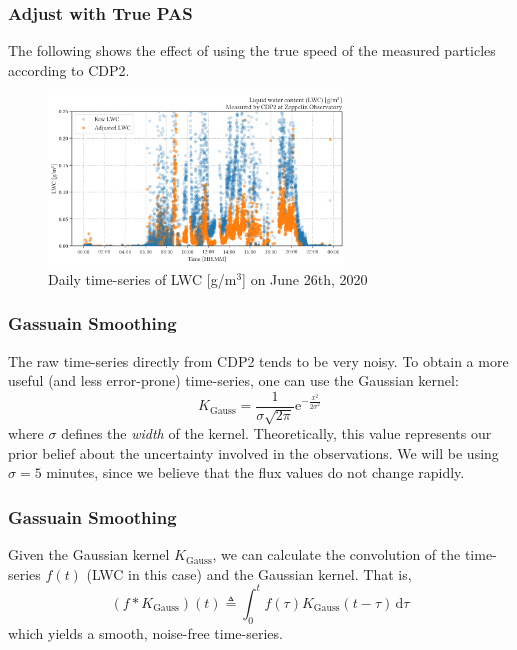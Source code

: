 \documentclass{beamer}
\begin{document}
\begin{frame}
    \frametitle{Adjust with True PAS}
    The following shows the effect of using the true speed of the measured particles according to CDP2.

    \begin{figure}
        \centering
        \includegraphics[width=0.7\textwidth]{img/pas.png}
        \caption{Daily time-series of LWC [g/m$^3$] on June 26th, 2020}
    \end{figure}
\end{frame}

\begin{frame}
    \frametitle{Gassuain Smoothing}
    The raw time-series directly from CDP2 tends to be very noisy. To obtain a more useful (and less error-prone) time-series, one can use the Gaussian kernel:
    \begin{equation*}
        K_\mathrm{Gauss} = \frac{1}{\sigma \sqrt{2 \pi}} \mathrm{e}^{-\frac{x^2}{2 \sigma^2}}
    \end{equation*}
    where $\sigma$ defines the \emph{width} of the kernel. Theoretically, this value represents our prior belief about the uncertainty involved in the observations. We will be using $\sigma = 5$ minutes, since we believe that the flux values do not change rapidly.
\end{frame}

\begin{frame}
    \frametitle{Gassuain Smoothing}
    Given the Gaussian kernel $K_\mathrm{Gauss}$, we can calculate the convolution of the time-series $f(t)$ (LWC in this case) and the Gaussian kernel. That is,
    \begin{equation}
        (f * K_\mathrm{Gauss})(t) \triangleq \int_0^t f(\tau) K_\mathrm{Gauss}(t - \tau) \,\mathrm{d} \tau
    \end{equation}
    which yields a smooth, noise-free time-series.
\end{frame}
\end{document}
